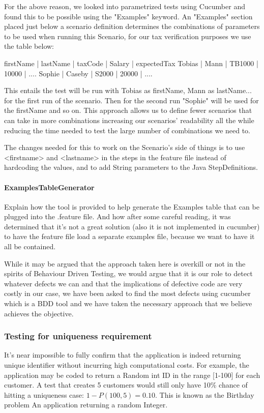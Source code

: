 For the above reason, we looked into parametrized tests using Cucumber and found this to be possible using the "Examples" keyword. 
An "Examples" section placed just below a scenario definition determines the combinations of parameters to be used when running this Scenario, for our tax verification purposes we use the table below: 
\begin{javacode}
firstName	| lastName	| taxCode 	| Salary 	| expectedTax
Tobias 		| Mann 		| TB1000 	| 10000 	| ....
Sophie		| Caseby	| S2000 	| 20000		| ....
\end{javacode}
This entails the test will be run with Tobias as firstName, Mann as lastName... for the first run of the scenario. Then for the second run "Sophie" will be used for the firstName and so on. 
This approach allows us to define fewer scenarios that can take in more combinations increasing our scenarios' readability all the while reducing the time needed to test the large number of combinations we need to. 

The changes needed for this to work on the Scenario's side of things is to use <firstname> and <lastname> in the steps in the feature file instead of hardcoding the values, and to add String parameters to the Java StepDefinitions.


\paragraph{ExamplesTableGenerator}
Explain how the tool is provided to help generate the Examples table that can be plugged into the .feature file. And how after some careful reading, it was determined that it's not a great solution (also it is not implemented in cucumber) to have the feature file load a separate examples file, because we want to have it all be contained. 
\par
While it may be argued that the approach taken here is overkill or not in the spirits of Behaviour Driven Testing, we would argue that it is our role to detect whatever defects we can and that the implications of defective code are very costly in our case, we have been asked to find the most defects using cucumber which is a BDD tool and we have taken the necessary approach that we believe achieves the objective. 

\subsubsection{Testing for uniqueness requirement}
It's near impossible to fully confirm that the application is indeed returning unique identifier without incurring high computational costs. For example, the application may be coded to return a Random int ID in the range [1-100] for each customer. A test that creates 5 customers would still only have 10\% chance of hitting a uniqueness case: 
$1 - P(100,5) = 0.10$. This is known as the Birthday problem %
An application returning a random Integer. 


